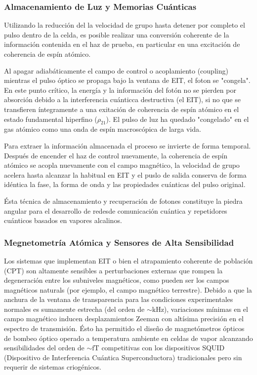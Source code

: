 \subsubsection*{Almacenamiento de Luz y Memorias Cuánticas}
Utilizando la reducción del la velocidad de grupo hasta detener por completo el pulso dentro de la celda, es posible realizar una conversión coherente de la información contenida en el haz de prueba, en particular en una excitación de coherencia de espín atómico. 

Al apagar adiabáticamente el campo de control o acoplamiento (coupling) mientras el pulso óptico se propaga bajo la ventana de EIT, el foton se "congela". En este punto crítico, la energía y la información del fotón no se pierden por absorción debido a la interferencia cuánticca destructiva (el EIT), si no que se transfieren íntegramente a una exitación de coherencia de espín atómico en el estado fundamental hiperfino ($\rho_{21}$). El pulso de luz ha quedado "congelado" en el gas atómico como una onda de espín macroscópica de larga vida.


Para extraer la información almacenada el proceso se invierte de forma temporal. Después de encender el haz de control nuevamente, la coherencia de espín atómico se acopla nuevamente con el campo magnético, la velocidad de grupo acelera hasta alcanzar la habitual en EIT y el puslo de salida conserva de forma idéntica la fase, la forma de onda y las propiedades cuánticas del pulso original.

Ésta técnica de almacenamiento y recuperación de fotones constituye la piedra angular para el desarrollo de redesde  comunicación cuántica y repetidores cuánticos basados en vapores alcalinos.

\subsubsection*{Megnetometría Atómica y Sensores de Alta Sensibilidad}
Los sistemas que implementan EIT o bien el atrapamiento coherente de población (CPT) son altamente sensibles a perturbaciones externas que rompen la degeneración entre los subniveles magnéticos, como pueden ser los campos magnéticos naturals (por ejemplo, el campo magnético terrestre). Debido a que la anchura de la ventana de transparencia para las condiciones experimentales normales es sumamente estrecha (del orden de $\sim \text{kHz}$), variaciones mínimas en el campo magnético inducen desplazamientos Zeeman con altísima precisión en el espectro de transmisión. Ésto ha permitido el diseño de magnetómetros ópticos de bombeo óptico operado a temperatura ambiente en celdas de vapor alcanzando sensibilidades del orden de $\sim \text{fT}$ competitivas con los dispositivos SQUID (Dispositivo de Interferencia Cuántica Superconductora) tradicionales pero sin requerir de sistemas criogénicos.

